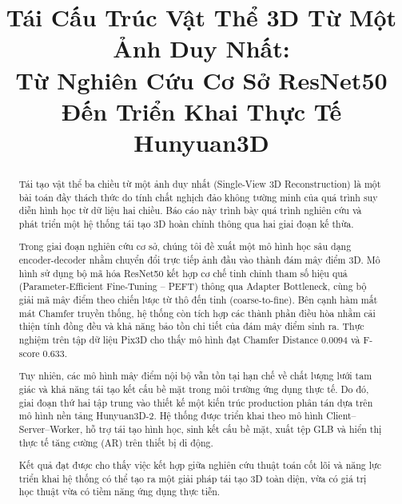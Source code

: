 \documentclass[conference,a4paper]{IEEEtran}
\begin{document}
\title{Tái Cấu Trúc Vật Thể 3D Từ Một Ảnh Duy Nhất:\\
Từ Nghiên Cứu Cơ Sở ResNet50 Đến Triển Khai Thực Tế Hunyuan3D}

\author{
}

\maketitle

\begin{abstract}
Tái tạo vật thể ba chiều từ một ảnh duy nhất (Single-View 3D Reconstruction) là một bài toán đầy thách thức do tính chất nghịch đảo không tường minh của quá trình suy diễn hình học từ dữ liệu hai chiều. Báo cáo này trình bày quá trình nghiên cứu và phát triển một hệ thống tái tạo 3D hoàn chỉnh thông qua hai giai đoạn kế thừa.

Trong giai đoạn nghiên cứu cơ sở, chúng tôi đề xuất một mô hình học sâu dạng encoder-decoder nhằm chuyển đổi trực tiếp ảnh đầu vào thành đám mây điểm 3D. Mô hình sử dụng bộ mã hóa ResNet50 kết hợp cơ chế tinh chỉnh tham số hiệu quả (Parameter-Efficient Fine-Tuning -- PEFT) thông qua Adapter Bottleneck, cùng bộ giải mã mây điểm theo chiến lược từ thô đến tinh (coarse-to-fine). Bên cạnh hàm mất mát Chamfer truyền thống, hệ thống còn tích hợp các thành phần điều hòa nhằm cải thiện tính đồng đều và khả năng bảo tồn chi tiết của đám mây điểm sinh ra. Thực nghiệm trên tập dữ liệu Pix3D cho thấy mô hình đạt Chamfer Distance 0.0094 và F-score 0.633.

Tuy nhiên, các mô hình mây điểm nội bộ vẫn tồn tại hạn chế về chất lượng lưới tam giác và khả năng tái tạo kết cấu bề mặt trong môi trường ứng dụng thực tế. Do đó, giai đoạn thứ hai tập trung vào thiết kế một kiến trúc production phân tán dựa trên mô hình nền tảng Hunyuan3D-2. Hệ thống được triển khai theo mô hình Client--Server--Worker, hỗ trợ tái tạo hình học, sinh kết cấu bề mặt, xuất tệp GLB và hiển thị thực tế tăng cường (AR) trên thiết bị di động.

Kết quả đạt được cho thấy việc kết hợp giữa nghiên cứu thuật toán cốt lõi và năng lực triển khai hệ thống có thể tạo ra một giải pháp tái tạo 3D toàn diện, vừa có giá trị học thuật vừa có tiềm năng ứng dụng thực tiễn.
\end{abstract}
\end{document}
